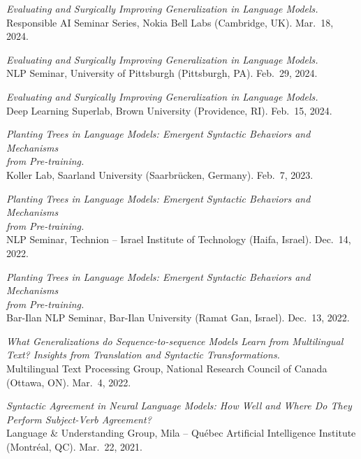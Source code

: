 \documentclass[10pt]{article}
\newcommand{\halfblankline}{\quad\vspace{-0.5\baselineskip}\pagebreak[3]}
\begin{document}
	\halfblankline

	\emph{Evaluating and Surgically Improving Generalization in Language Models.}\\Responsible AI Seminar Series, Nokia Bell Labs (Cambridge, UK). Mar.\ 18, 2024.

	\halfblankline

	\emph{Evaluating and Surgically Improving Generalization in Language Models.}\\NLP Seminar, University of Pittsburgh (Pittsburgh, PA). Feb.\ 29, 2024.

	\halfblankline

	\emph{Evaluating and Surgically Improving Generalization in Language Models.}\\Deep Learning Superlab, Brown University (Providence, RI). Feb.\ 15, 2024.

	\halfblankline

	\emph{Planting Trees in Language Models: Emergent Syntactic Behaviors and Mechanisms\\from Pre-training.}\\Koller Lab, Saarland University (Saarbrücken, Germany). Feb.\ 7, 2023.

	\halfblankline

	\emph{Planting Trees in Language Models: Emergent Syntactic Behaviors and Mechanisms\\from Pre-training.}\\NLP Seminar, Technion -- Israel Institute of Technology (Haifa, Israel). Dec.\ 14, 2022.

	\halfblankline
	
	\emph{Planting Trees in Language Models: Emergent Syntactic Behaviors and Mechanisms\\from Pre-training.}\\Bar-Ilan NLP Seminar, Bar-Ilan University (Ramat Gan, Israel). Dec.\ 13, 2022.

	\halfblankline

	\emph{What Generalizations do Sequence-to-sequence Models Learn from Multilingual Text? Insights from Translation and Syntactic Transformations.}\\Multilingual Text Processing Group, National Research Council of Canada (Ottawa, ON). Mar.\ 4, 2022.
	
	\halfblankline

	\emph{Syntactic Agreement in Neural Language Models: How Well and Where Do They Perform Subject-Verb Agreement?}\\Language \& Understanding Group, Mila -- Québec Artificial Intelligence Institute (Montréal, QC). Mar.\ 22, 2021.
	
\end{document}
